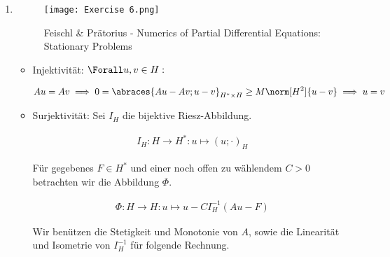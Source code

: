 \begin{solution}

\phantom{}

\begin{enumerate}[label = \textbf{\alph*)}]

  \item \phantom{}
  
  \begin{figure}[h!]
    \centering
    \texttt{[image: Exercise 6.png]}
    \caption{Feischl \& Prätorius - Numerics of Partial Differential Equations: Stationary Problems}
  \end{figure}
  
  \begin{itemize}
  
    \item Injektivität:
    $\Forall u, v \in H:$

    \begin{align*}
      Au = Av
      \implies
      0 = \abraces{Au - Av; u - v}_{H^\ast \times H} \geq M \norm[H^2]{u -v}
      \implies
      u = v
    \end{align*}

    \item Surjektivität:
    Sei $I_H$ die bijektive Riesz-Abbildung.

    \begin{align*}
      I_H:
      H \to H^\ast:
      u \mapsto (u; \cdot)_H
    \end{align*}

    Für gegebenes $F \in H^\ast$ und einer noch offen zu wählendem $C > 0$ betrachten wir die Abbildung $\Phi$.

    \begin{align*}
      \Phi:
      H \to H:
      u \mapsto u - C I_H^{-1}(Au - F)
    \end{align*}

    Wir benützen die Stetigkeit und Monotonie von $A$, sowie die Linearität und Isometrie von $I_H^{-1}$ für folgende Rechnung.


\end{itemize}
\end{enumerate}
\end{solution}

